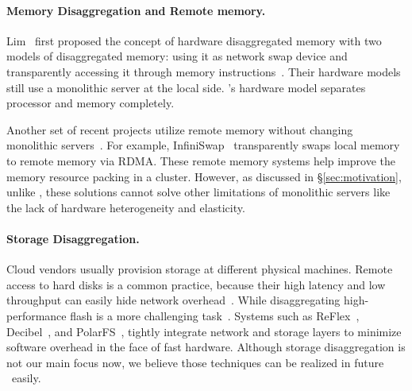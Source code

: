 \documentclass[10pt,times,twocolumn]{z2-article}
\begin{document}
{{{{{{{\paragraph{Memory Disaggregation and Remote memory.}
Lim \etal\ first proposed the concept of hardware disaggregated memory
with two models of disaggregated memory: using it as network swap device 
and transparently accessing it through memory instructions~\cite{Lim09-disaggregate,Lim12-HPCA}.
Their hardware models still use a monolithic server at the local side. 
\lego's hardware model separates processor and memory completely. %

Another set of recent projects utilize remote memory without changing 
monolithic servers~\cite{Dragojevic14-FaRM,Nelson15-ATC,remote-region-atc18,GU17-NSDI,Novakovic16-SOCC,hotpot-socc17}.
For example, InfiniSwap~\cite{GU17-NSDI} transparently swaps local memory to remote memory via RDMA.
These remote memory systems help improve the memory resource packing in a cluster.
However, as discussed in \S\ref{sec:motivation}, unlike \lego, these solutions cannot solve other limitations 
of monolithic servers like the lack of hardware heterogeneity and elasticity. 

\paragraph{Storage Disaggregation.}
Cloud vendors usually provision storage at different physical machines\cite{deepview-nsdi18,url:aws-storage,url:vmware-vSAN}.
Remote access to hard disks is a common practice, because their high latency and low throughput
can easily hide network overhead~\cite{petal-asplos96,blizzard-nsdi14,Parallax-hotos15,Legtchenko-hotstorage17}.
While disaggregating high-performance flash is a more challenging task~\cite{FlashDisaggregation,url:facebook-lighting}.
Systems such as ReFlex~\cite{ReFlex}, Decibel~\cite{decibel-nsdi17}, and PolarFS~\cite{PolarFS-VLDB18},
tightly integrate network and storage layers to minimize software overhead in the face of fast hardware.
Although storage disaggregation is not our main focus now,
we believe those techniques can be realized in future \lego\ easily.

}}}}}}}
\end{document}
